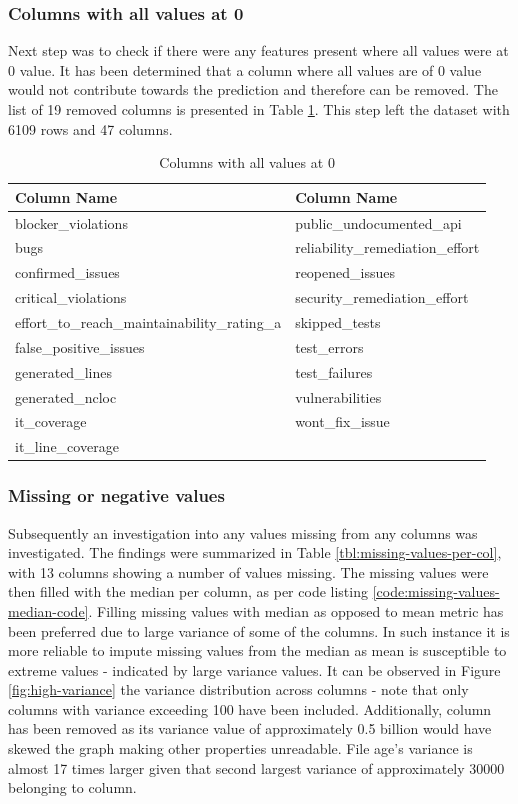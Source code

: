\subsubsection{Columns with all values at 0}\label{sec:impl-data-analysis:all-cols-at-0}
Next step was to check if there were any features present where all values were at 0 value. It has been determined that a column where all values are of 0 value would not contribute towards the prediction and therefore can be removed. The list of 19 removed columns is presented in Table \ref{tbl:zero-value-columns}. This step left the dataset with 6109 rows and 47 columns.

\begin{table}[h!]
\centering
\caption{Columns with all values at 0}
\label{tbl:zero-value-columns}
\begin{tabular}{@{}ll@{}}
\toprule
Column Name & Column Name \\ \midrule
blocker\_violations & public\_undocumented\_api \\
bugs & reliability\_remediation\_effort \\
confirmed\_issues & reopened\_issues \\
critical\_violations & security\_remediation\_effort \\
effort\_to\_reach\_maintainability\_rating\_a & skipped\_tests \\
false\_positive\_issues & test\_errors \\
generated\_lines & test\_failures \\
generated\_ncloc & vulnerabilities \\
it\_coverage & wont\_fix\_issue \\
it\_line\_coverage &  \\ \bottomrule
\end{tabular}
\end{table}



\subsubsection{Missing or negative values}\label{sec:impl-data-analysis:missing-or-negative-values}
Subsequently an investigation into any values missing from any columns was investigated. The findings were summarized in Table \ref{tbl:missing-values-per-col}, with 13 columns showing a number of values missing. The missing values were then filled with the median per column, as per code listing \ref{code:missing-values-median-code}. Filling missing values with median as opposed to mean metric has been preferred due to large variance of some of the columns. In such instance it is more reliable to impute missing values from the median as mean is susceptible to extreme values - indicated by large variance values. It can be observed in Figure \ref{fig:high-variance} the variance distribution across columns - note that only columns with variance exceeding 100 have been included. Additionally, \fileAgeInSec{} column has been removed as its variance value of approximately 0.5 billion would have skewed the graph making other properties unreadable. File age's variance is almost 17 times larger given that second largest variance of approximately 30000 belonging to \lines{} column.

